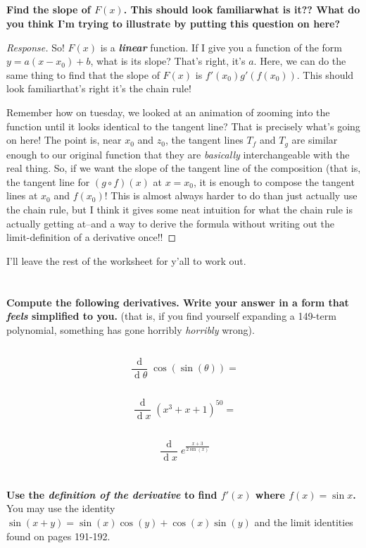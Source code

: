 \documentclass[english]{article}
\renewcommand{\d}[1]{\ensuremath{\operatorname{d}\!{#1}}}
\newcommand{\ddx}[1]{\frac{\d{}}{\d{#1}}}
\newcommand{\prob}[1]{\setcounter{section}{#1-1}\section{}}
\newcommand{\prt}[1]{\setcounter{subsection}{#1-1}\subsection{}}
\theoremstyle{remark}
\theoremstyle{definition}
\begin{document}
\prt{3}\textbf{Find the slope of $F(x)$. This should look familiar\textemdash what is it?? What do you think I'm trying to illustrate by putting this question on here?}
\begin{proof}[Response]
	So! $F(x)$ is a \textbf{\emph{linear}} function. If I give you a function of the form $y=a(x-x_0)+b$, what is its slope? That's right, it's $a$. Here, we can do the same thing to find that the slope of $F(x)$ is $f'(x_0)g'(f(x_0))$. This should look familiar\textellipsis that's right it's the chain rule!
	
	Remember how on tuesday, we looked at an animation of zooming into the function until it looks identical to the tangent line? That is precisely what's going on here! The point is, near $x_0$ and $z_0$, the tangent lines $T_f$ and $T_g$ are similar enough to our original function that they are \emph{basically} interchangeable with the real thing. So, if we want the slope of the tangent line of the composition (that is, the tangent line for $(g\circ f) (x)$ at $x=x_0$, it is enough to compose the tangent lines at $x_0$ and $f(x_0)$! This is almost always harder to do than just actually use the chain rule, but I think it gives some neat intuition for what the chain rule is actually getting at--and a way to derive the formula without writing out the limit-definition of a derivative once!!
\end{proof}

I'll leave the rest of the worksheet for y'all to work out.
\prob{2}\textbf{Compute the following derivatives. Write your answer in a form that \emph{feels} simplified to you.} (that is, if you find yourself expanding a 149-term polynomial, something has gone horribly \emph{horribly} wrong).
\prt{1} $$\ddx{\theta}{\cos(\sin(\theta))}=$$\vspace{5cm}
\prt{2}$$\ddx{x}(x^3+x+1)^{50}=$$\vspace{5cm}
\prt{3}$$\ddx{x}e^{\frac{x+3}{2\sin(x)}}$$\vspace{5cm}

\prob{3} \textbf{Use the \emph{definition of the derivative} to find $f'(x)$ where $f(x)=\sin x$.} You may use the identity $\sin(x+y)=\sin(x)\cos(y)+\cos(x)\sin(y)$ and the limit identities found on pages 191-192.
\end{document}
